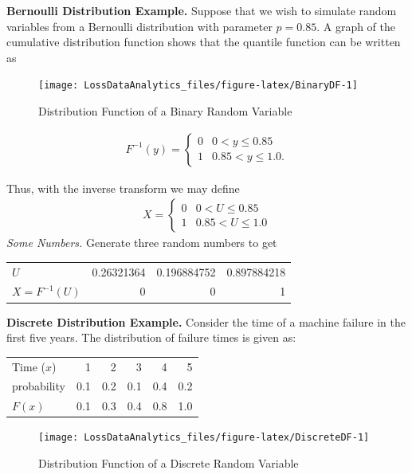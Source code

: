 \documentclass[]{book}
\begin{document}
\textbf{Bernoulli Distribution Example.} Suppose that we wish to
simulate random variables from a Bernoulli distribution with parameter
\(p=0.85\). A graph of the cumulative distribution function shows that
the quantile function can be written as

\begin{figure}

{\centering \texttt{[image: LossDataAnalytics\_files/figure-latex/BinaryDF-1]} 

}

\caption{Distribution Function of a Binary Random Variable}\label{fig:BinaryDF}
\end{figure}

\[\begin{aligned}
F^{-1}(y) = \left\{ \begin{array}{cc}
              0 & 0<y \leq 0.85 \\
              1 & 0.85 < y  \leq  1.0 .
            \end{array} \right.\end{aligned}\]

Thus, with the inverse transform we may define \[\begin{aligned}
X = \left\{ \begin{array}{cc}
              0 & 0<U \leq 0.85  \\
              1 &  0.85 < U  \leq  1.0
            \end{array} \right.\end{aligned}\] \emph{Some Numbers.}
Generate three random numbers to get

\begin{longtable}[]{@{}lrrr@{}}
\toprule
\(U\) & 0.26321364 & 0.196884752 & 0.897884218\tabularnewline
\(X =F^{-1}(U)\) & 0 & 0 & 1\tabularnewline
\bottomrule
\end{longtable}

\textbf{Discrete Distribution Example.} Consider the time of a machine
failure in the first five years. The distribution of failure times is
given as:

\begin{longtable}[]{@{}lrrrrr@{}}
\toprule
Time (\(x\)) & 1 & 2 & 3 & 4 & 5\tabularnewline
probability & 0.1 & 0.2 & 0.1 & 0.4 & 0.2\tabularnewline
\(F(x)\) & 0.1 & 0.3 & 0.4 & 0.8 & 1.0\tabularnewline
\bottomrule
\end{longtable}

\begin{figure}

{\centering \texttt{[image: LossDataAnalytics\_files/figure-latex/DiscreteDF-1]} 

}

\caption{Distribution Function of a Discrete Random Variable}\label{fig:DiscreteDF}
\end{figure}
\end{document}
